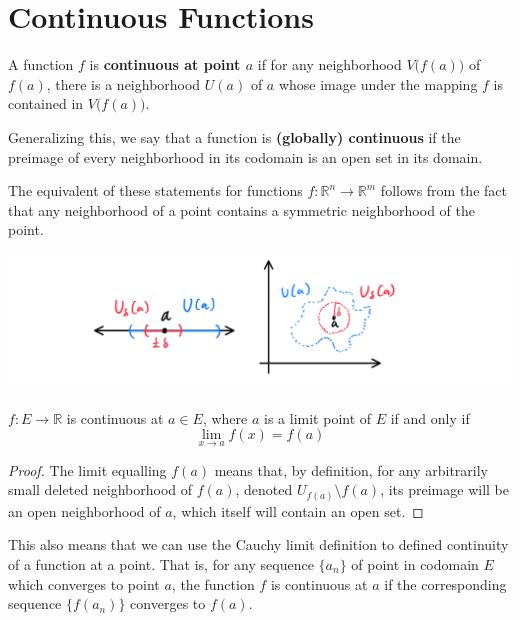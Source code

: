 \documentclass{article}
\begin{document}
\section{Continuous Functions}

    \begin{definition}
      A function $f$ is \textbf{continuous at point $a$} if for any neighborhood $V\big(f(a)\big)$ of $f(a)$, there is a neighborhood $U(a)$ of $a$ whose image under the mapping $f$ is contained in $V\big( f(a)\big)$. 

      Generalizing this, we say that a function is \textbf{(globally) continuous} if the preimage of every neighborhood in its codomain is an open set in its domain. 
    \end{definition}

    The equivalent of these statements for functions $f: \mathbb{R}^n \longrightarrow \mathbb{R}^m$ follows from the fact that any neighborhood of a point contains a symmetric neighborhood of the point. 
    \begin{center}
        \includegraphics[scale=0.3]{img/Symmetric_Neighborhood_in_Neighborhood.PNG}
    \end{center}

    \begin{lemma}
      $f: E \longrightarrow \mathbb{R}$ is continuous at $a \in E$, where $a$ is a limit point of $E$ if and only if 
      \[\lim_{x \rightarrow a} f(x) = f(a)\]
    \end{lemma}
    \begin{proof}
    The limit equalling $f(a)$ means that, by definition, for any arbitrarily small deleted neighborhood of $f(a)$, denoted $U_{f(a)} \setminus f(a)$, its preimage will be an open neighborhood of $a$, which itself will contain an open set. 
    \end{proof}

    This also means that we can use the Cauchy limit definition to defined continuity of a function at a point. That is, for any sequence $\{a_n\}$ of point in codomain $E$ which converges to point $a$, the function $f$ is continuous at $a$ if the corresponding sequence $\{f(a_n)\}$ converges to $f(a)$.
\end{document}
